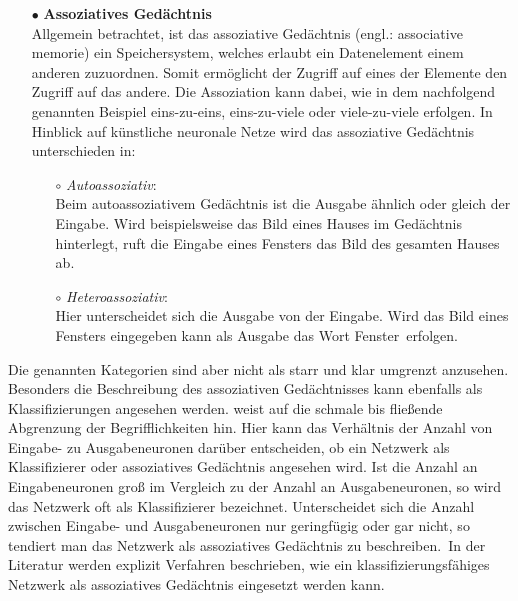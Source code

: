 \begin{itemize}
\item[\textbf{$\bullet$}] \textbf{Assoziatives Gedächtnis}\\%
Allgemein betrachtet, ist das assoziative Gedächtnis (engl.: associative memorie) ein Speichersystem, welches erlaubt ein Datenelement einem anderen zuzuordnen. Somit ermöglicht der Zugriff auf eines der Elemente den Zugriff auf das andere.
Die Assoziation kann dabei, wie in dem nachfolgend genannten Beispiel eins-zu-eins, eins-zu-viele oder viele-zu-viele erfolgen.
In Hinblick auf künstliche neuronale Netze wird das assoziative Gedächtnis unterschieden in:
    \begin{itemize}
    \item[\textbf{$\circ$}] \textit{Autoassoziativ}:\\%
    Beim autoassoziativem Gedächtnis ist die Ausgabe ähnlich oder gleich der \hbox{Eingabe}. Wird beispielsweise das Bild eines Hauses im Gedächtnis \glqq hinterlegt\grqq , ruft die Eingabe eines Fensters das Bild des gesamten Hauses ab.
    
    \item[\textbf{$\circ$}] \textit{Heteroassoziativ}:\\%
    Hier unterscheidet sich die Ausgabe von der Eingabe. Wird das Bild eines Fensters eingegeben kann als Ausgabe das Wort \glqq Fenster\grqq~erfolgen.\,
    
    \end{itemize}

\end{itemize}

Die genannten Kategorien sind aber nicht als starr und klar umgrenzt anzusehen. Besonders die Beschreibung des assoziativen Gedächtnisses kann ebenfalls als Klassifizierungen angesehen werden. \citet{Gurney1997} weist auf die schmale bis fließende Abgrenzung der Begrifflichkeiten hin. Hier kann das Verhältnis der Anzahl von Eingabe- zu Ausgabeneuronen darüber entscheiden, ob ein Netzwerk als Klassifizierer oder assoziatives Gedächtnis angesehen wird. Ist die Anzahl an Eingabeneuronen groß im Vergleich zu der Anzahl an Ausgabeneuronen, so wird das Netzwerk oft als Klassifizierer bezeichnet. Unterscheidet sich die Anzahl zwischen Eingabe- und Ausgabeneuronen nur geringfügig oder gar nicht, so tendiert man das Netzwerk als assoziatives Gedächtnis zu beschreiben.\, In der Literatur werden explizit Verfahren beschrieben, wie ein klassifizierungsfähiges Netzwerk als assoziatives Gedächtnis eingesetzt werden kann.\,

